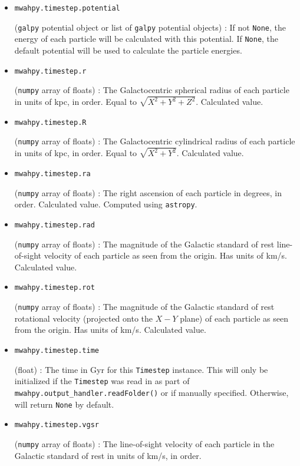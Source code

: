 \documentclass{article}
\begin{document}
\begin{itemize}
\item \verb!mwahpy.timestep.potential!

(\verb!galpy! potential object or list of \verb!galpy! potential objects) : If not \verb!None!, the energy of each particle will be calculated with this potential. If \verb!None!, the \mwahpy default potential will be used to calculate the particle energies. 

\item \verb!mwahpy.timestep.r!

(\verb!numpy! array of floats) : The Galactocentric spherical radius of each particle in units of kpc, in order. Equal to $\sqrt{X^2 + Y^2 + Z^2}.$ Calculated value.

\item \verb!mwahpy.timestep.R!

(\verb!numpy! array of floats) : The Galactocentric cylindrical radius of each particle in units of kpc, in order. Equal to $\sqrt{X^2 + Y^2}.$ Calculated value.

\item \verb!mwahpy.timestep.ra!

(\verb!numpy! array of floats) : The right ascension of each particle in degrees, in order. Calculated value. Computed using \verb!astropy!.

\item \verb!mwahpy.timestep.rad!

(\verb!numpy! array of floats) : The magnitude of the Galactic standard of rest line-of-sight velocity of each particle as seen from the origin. Has units of km/s. Calculated value.

\item \verb!mwahpy.timestep.rot!

(\verb!numpy! array of floats) : The magnitude of the Galactic standard of rest rotational velocity (projected onto the $X-Y$ plane) of each particle as seen from the origin. Has units of km/s. Calculated value.

\item \verb!mwahpy.timestep.time!

(float) : The time in Gyr for this \verb!Timestep! instance. This will only be initialized if the \verb!Timestep! was read in as part of \verb!mwahpy.output_handler.readFolder()! or if manually specified. Otherwise, will return \verb!None! by default.

\item \verb!mwahpy.timestep.vgsr!

(\verb!numpy! array of floats) : The line-of-sight velocity of each particle in the Galactic standard of rest in units of km/s, in order.


\end{itemize}
\end{document}

